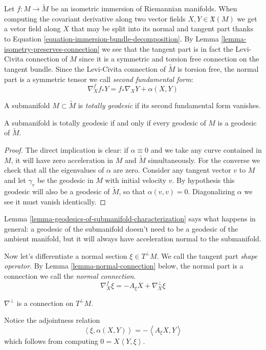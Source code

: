 Let $f:M \to \tilde{M}$ be an isometric immersion of Riemannian manifolds. When
computing the covariant derivative along two vector fields 
$X,Y \in\mathfrak{X}(M)$ we get a vetor field along $X$ that may be split into
its normal and tangent part thanks to Equation 
\ref{equation-immersion-bundle-decomposition}. By Lemma
\ref{lemma-isometry-preserves-connection} we see that the tangent part is
in fact the Levi-Civita connection of $M$ since it is a symmetric and torsion
free connection on the tangent bundle. Since the Levi-Civita connection of
$\tilde{M}$ is torsion free, the normal part is a
symmetric tensor we call {\it second fundamental form}:
\begin{equation}
\label{equation-second-fundamental-form}
\nabla^{f}_X f_*Y=f_*\nabla_XY+\alpha(X,Y)
\end{equation}
\begin{definition}
\label{definition-totally-geodesic-submanifold}
A submanifold $M\subset\tilde{M}$ is {\it totally geodesic} if its second
fundamental form vanishes.
\end{definition}

\begin{lemma}
\label{lemma-totally-geodesic-submanifold}
A submanifold is totally geodesic if and only if every geodesic of $M$ is a
geodesic of $\tilde{M}$.
\end{lemma}

\begin{proof}
The direct implication is clear: if $\alpha \equiv 0$ and we take any curve
contained in $M$, it will have zero acceleration in $M$ and $\tilde{M}$
simultaneously. For the converse we check that all the eigenvalues
of $\alpha$ are zero. Consider any tangent vector $v$ to $M$ and let $\gamma_v$
be the geodesic in $M$ with initial velocity $v$. By hypothesis this geodesic
will also be a geodesic of $\tilde{M}$, so that $\alpha(v,v)=0$. Diagonalizing
$\alpha$ we see it must vanish identically.
\end{proof}

Lemma \ref{lemma-geodesics-of-submanifold-characterization} says what happens in
general: a geodesic of the submanifold doesn't need to be a geodesic of the
ambient manifold, but it will always have acceleration normal to the
submanifold.

\medskip\noindent

Now let's differentiate a normal section $\xi\in T^\perp M$. 
We call the tangent part {\it shape operator}. By Lemma
\ref{lemma-normal-connection} below, the normal part is a connection 
we call the {\it normal connection}.
\begin{equation}
\label{equation-shape-operator}
\nabla^f_X\xi=-A_\xi X+\nabla^\perp_X\xi
\end{equation}
\begin{lemma}
\label{lemma-normal-connection}
$\nabla^\perp$ is a connection on $T^\perp M$.
\end{lemma}
Notice the adjointness relation
\begin{equation}
\label{equation-second-fundamental-form-and-shape-operator}
\left<\xi,\alpha(X,Y)\right>=-\left<A_\xi X,Y\right>
\end{equation}
which follows from computing $0=X\left<Y,\xi\right>$.

